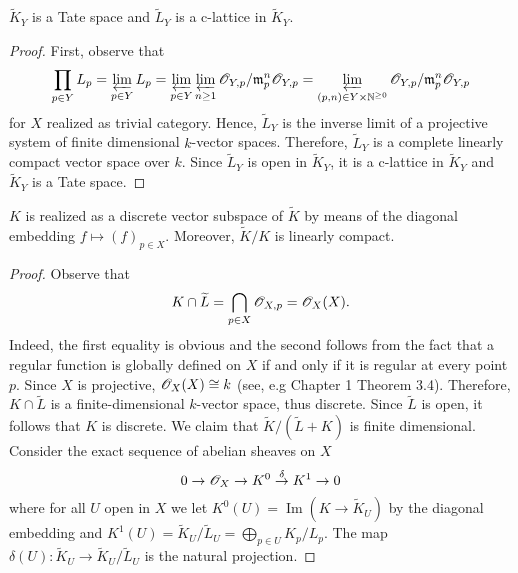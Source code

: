 \begin{proposition}\label{prop:adèle-is-a-tate-space}
	$\widetilde{K}_{Y}$ is a Tate space and $\widetilde{L}_{Y}$ is a c-lattice in $\widetilde{K}_{Y}$. 
\end{proposition}
\begin{proof}
	First, observe that
	\[
		\prod_{p\in Y} L_{p} = \varprojlim_{p\in Y} L_{p} = \varprojlim_{p\in Y}\varprojlim_{n\geq 1} {\mathscr O}_{Y,p}/\mathfrak{m}_{p}^{n}{\mathscr O}_{Y,p} = \varprojlim_{(p,n)\in Y\times {\mathbb N}^{\geq 0}} {\mathscr O}_{Y,p}/\mathfrak{m}_{p}^{n}{\mathscr O}_{Y,p}
	\] 
	for $X$ realized as trivial category. Hence, $\widetilde{L}_{Y}$ is the inverse limit of a projective system of finite dimensional $k$-vector spaces. Therefore, $\widetilde{L}_{Y}$ is a complete linearly compact vector space over $k$. Since $\widetilde{L}_{Y}$ is open in $\widetilde{K}_{Y}$, it is a c-lattice in $\widetilde{K}_{Y}$ and $\widetilde{K}_{Y}$ is a Tate space.
\end{proof}

\begin{proposition}\label{prop:K-discrete-in-adèle}
	$K$ is realized as a discrete vector subspace of $\widetilde{K}$ by means of the diagonal embedding $f \mapsto (f)_{p\in X}$. Moreover, $\widetilde{K}/K$ is linearly compact. 
\end{proposition}
\begin{proof}
	Observe that 
	\[
		K\cap \widetilde{L} = \bigcap_{p\in X}{\mathscr O}_{X,p} = {\mathscr O}_{X}(X).
	\]
	Indeed, the first equality is obvious and the second follows from the fact that a regular function is globally defined on $X$ if and only if it is regular at every point $p$. Since $X$ is projective, ${\mathscr O}_{X}(X) \cong k$ (see, e.g \cite{hartshorne} Chapter 1 Theorem 3.4). Therefore, $K\cap \widetilde{L}$ is a finite-dimensional $k$-vector space, thus discrete. Since $\widetilde{L}$ is open, it follows that $K$ is discrete. We claim that $\widetilde{K}/(\widetilde{L} + K)$ is finite dimensional. Consider the exact sequence of abelian sheaves on $X$
	\[
		0 \rightarrow {\mathscr O}_{X} \rightarrow  { K } ^ { 0 } \stackrel { \delta } { \rightarrow }  { K } ^ { 1 } \rightarrow 0
	\]
	where for all $U$ open in $X$ we let $K^{0}(U) = \operatorname{Im}(K \to \widetilde{K}_{U})$ by the diagonal embedding and $K^{1}(U) = \widetilde{K}_{U}/\widetilde{L}_{U} = \bigoplus_{p\in U}K_{p}/L_{p}$. The map $\delta(U)\colon \widetilde{K}_{U} \to \widetilde{K}_{U}/\widetilde{L}_{U}$ is the natural projection.
\end{proof}